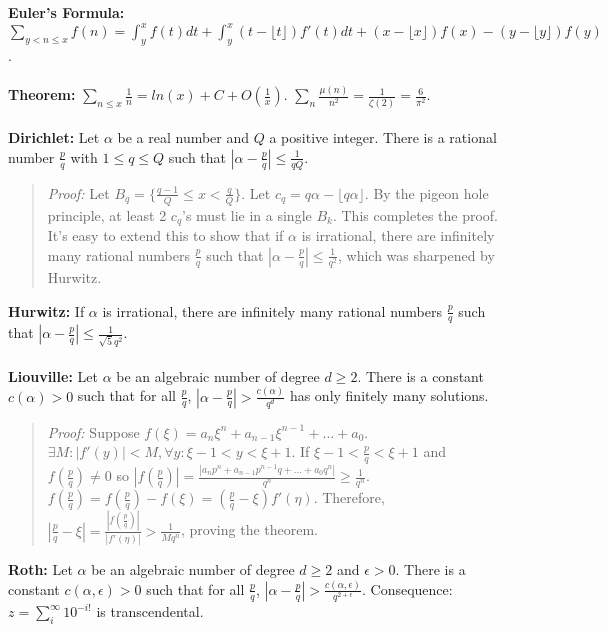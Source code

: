 {\bf Euler's Formula:} $\sum_{y <n \leq x} f(n)= \int_y^x f(t) dt +
\int_y^x (t- \lfloor t \rfloor) f'(t) dt +
(x- \lfloor x \rfloor) f(x) - (y- \lfloor y \rfloor) f(y)$.
\\
\\
{\bf Theorem:} 
$\sum_{n \leq x} {\frac 1 n} = ln(x) + C + O({\frac 1 x})$.
$\sum_n {\frac {\mu(n)} {n^2}}= {\frac 1 {\zeta(2)}}= {\frac {6} {\pi^2}}$.
\\
\\
{\bf Dirichlet:}  Let $\alpha$ be a real number and $Q$ a positive integer.
There is a rational number ${\frac p q}$ with $1 \leq q \leq Q$ such that
$|\alpha - {\frac p q}| \leq {\frac 1 {qQ}}$.
\begin{quote}
\emph{Proof:}  Let $B_q= \{ {\frac {q-1} Q} \leq x < {\frac q Q} \}$.  Let
$c_q = q \alpha - \lfloor q \alpha \rfloor$.  By the pigeon hole principle,
at least 2 $c_q$'s must lie in a single $B_k$.  This completes the proof.
It's easy to extend this to show that if $\alpha$ is irrational,
there are infinitely many rational numbers ${\frac p q}$ such that
$|\alpha - {\frac p q}| \leq {\frac 1 {q^2}}$, which was sharpened by
Hurwitz.
\end{quote}
{\bf Hurwitz:}  If $\alpha$ is irrational,
there are infinitely many
rational numbers ${\frac p q}$ such that
$|\alpha - {\frac p q}| \leq {\frac 1 {{\sqrt 5} q^2}}$.
\\
\\
{\bf Liouville:}  Let $\alpha$ be an algebraic number of degree $d \geq 2$.
There is a constant $c(\alpha)>0$ such that for all ${\frac p q}$,
$|\alpha - {\frac p q}| > {\frac {c(\alpha)} {q^d}}$ has only finitely
many solutions.
\begin{quote}
\emph{Proof:}  
Suppose $f(\xi)= a_n \xi^n+ a_{n-1} \xi^{n-1} + \ldots + a_0$.  
$\exists M: |f'(y)|<M, \forall y: \xi-1 < y < \xi+1$.
If $\xi-1 < {\frac p q} < \xi+1$ and $f({\frac p q}) \ne 0$ so
$|f({\frac p q})|= {\frac {|a_n p^n + a_{n-1} p^{n-1}q + \ldots + a_0 q^n|}
{q^n}} \geq {\frac 1 {q^n}}$.
$f({\frac p q})= f({\frac p q})-f(\xi)= ({\frac p q} - \xi) f'(\eta)$.
Therefore, $|{\frac p q} - \xi|= {\frac {|f({\frac p q})|} {|f'(\eta)|}} > {\frac 1 {M q^n}}$,
proving the theorem.
\end{quote}
{\bf Roth:}  Let $\alpha$ be an algebraic number of degree $d \geq 2$ and
$\epsilon >0$.
There is a constant $c(\alpha, \epsilon)>0$ such that for all ${\frac p q}$,
$|\alpha - {\frac p q}| > {\frac {c(\alpha, \epsilon)} {q^{2+\epsilon}}}$.
Consequence: $z = \sum_i^\infty 10^{-i!}$ is transcendental.
